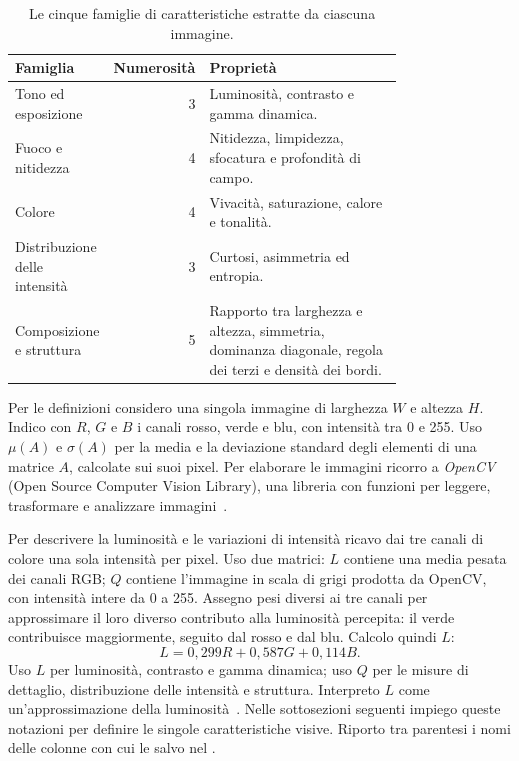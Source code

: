 \begin{table}[htbp]
    \centering
    \small
    \caption{Le cinque famiglie di caratteristiche estratte da ciascuna immagine.}
    \label{tab:feature-famiglie}
    \begin{tabular}{@{}>{\raggedright\arraybackslash}p{0.25\linewidth}r>{\raggedright\arraybackslash}p{0.52\linewidth}@{}}
        \toprule
        Famiglia & Numerosità & Proprietà \\
        \midrule
        Tono ed esposizione & 3 & Luminosità, contrasto e gamma dinamica. \\
        Fuoco e nitidezza & 4 & Nitidezza, limpidezza, sfocatura e profondità di campo. \\
        Colore & 4 & Vivacità, saturazione, calore e tonalità. \\
        Distribuzione delle intensità & 3 & Curtosi, asimmetria ed entropia. \\
        Composizione e struttura & 5 & Rapporto tra larghezza e altezza, simmetria, dominanza diagonale, regola dei terzi e densità dei bordi. \\
        \bottomrule
    \end{tabular}
\end{table}

\newpage
Per le definizioni considero una singola immagine di larghezza $W$ e altezza $H$. Indico con $R$, $G$ e $B$ i canali rosso, verde e blu, con intensità tra 0 e 255. Uso $\mu(A)$ e $\sigma(A)$ per la media e la deviazione standard degli elementi di una matrice $A$, calcolate sui suoi pixel. Per elaborare le immagini ricorro a \emph{OpenCV} (Open Source Computer Vision Library), una libreria con funzioni per leggere, trasformare e analizzare immagini~\cite{opencv_library}.

Per descrivere la luminosità e le variazioni di intensità ricavo dai tre canali di colore una sola intensità per pixel. Uso due matrici: $L$ contiene una media pesata dei canali RGB; $Q$ contiene l'immagine in scala di grigi prodotta da OpenCV, con intensità intere da 0 a 255. Assegno pesi diversi ai tre canali per approssimare il loro diverso contributo alla luminosità percepita: il verde contribuisce maggiormente, seguito dal rosso e dal blu. Calcolo quindi $L$:
\begin{equation}
    L=0{,}299R+0{,}587G+0{,}114B.
    \label{eq:feature-intensita}
\end{equation}
Uso $L$ per luminosità, contrasto e gamma dinamica; uso $Q$ per le misure di dettaglio, distribuzione delle intensità e struttura. Interpreto $L$ come un'approssimazione della luminosità~\cite{itu_bt601}. Nelle sottosezioni seguenti impiego queste notazioni per definire le singole caratteristiche visive. Riporto tra parentesi i nomi delle colonne con cui le salvo nel .

